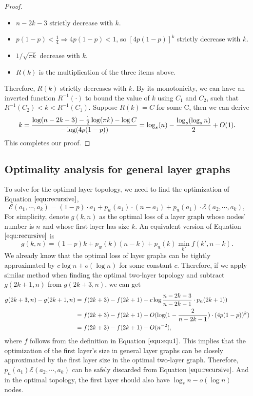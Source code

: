 \documentclass[a4paper,UKenglish]{lipics}
\theoremstyle{definition}
\begin{document}
\begin{proof}
\begin{itemize}
\item $ n-2k-3 $ strictly decrease with $ k $.
\item $ p(1-p) < \frac{1}{4} \Rightarrow 4p(1-p)<1 $, so $ \left[4p(1-p)\right]^k $ strictly decrease with $ k $.
\item $ {1}\Big/{\sqrt{\pi k}} $ decrease with $ k $.
\item $R(k)$ is the multiplication of the three items above.
\end{itemize}
Therefore, $R(k)$ strictly decreases with $k$. 
By its monotonicity, we can have an inverted function $ R^{-1}(\cdot)$ to bound the value of $k$ using $C_1$ and $C_2$, 
	such that $R^{-1}(C_2) < k < R^{-1}(C_1)$. 
Suppose $R(k)=C$ for some C, then we can derive
\begin{equation*}
	k 
= 
	\frac{\log(n-2k-3)-\frac{1}{2}\log(\pi k) - \log C}{-\log(4p(1-p))}
=
	\log_{s}(n)-{\log_s( \log_s n)\over 2} + O(1).
\end{equation*}
This completes our proof.
\end{proof}



\subsection {Optimality analysis for general layer graphs}
\label {subsec:optimality all layers}

To solve for the optimal layer topology, we need to find the optimization of Equation $\ref{equ:recursive}$,
\begin{equation*}
\mathcal{E}(a_1, \dotsb, a_k)
=
(1-p)\cdot a_1 + p_w(a_1)\cdot (n - a_1) + p_n(a_1)\cdot \mathcal{E}(a_2, \dotsb, a_k),
\end{equation*}
For simplicity, denote $g(k, n)$ as the optimal loss of a layer graph whose nodes' number is $n$ and whose first layer has size $k$.
An equivalent version of Equation $\ref{equ:recursive}$ is
\begin{equation*}
g(k, n) = (1-p)k + p_w(k)(n-k) + p_n(k)\min_{k'}f(k',n-k).
\end{equation*}
We already know that the optimal loss of layer graphs can be tightly approximated by $c\log n + o(\log n)$ for some constant $c$.
Therefore, if we apply similar method when finding the optimal two-layer topology and subtract $g(2k+1, n)$ from $g(2k+3, n)$,
	we can get
\begin{align*}
	g(2k+3,n) - g(2k+1,n)
& =
	f(2k+3) - f(2k+1) + c\log {n - 2k - 3 \over n - 2k - 1}\cdot p_n(2k+1) ) \\
& =
	f(2k+3) - f(2k+1) + O( \log (1 - {2 \over n - 2k - 1})\cdot (4p(1-p))^{k}) \\
& =
	f(2k+3) - f(2k+1) + O(n^{-2}),
\end{align*}
where $f$ follows from the definition in Equation $\ref{equ:equ1}$.
This implies that the optimization of the first layer's size in general layer graphs can be closely approximated by
	the first layer size in the optimal two-layer graph.
Therefore, $p_n(a_1)\mathcal{E}(a_2, \dotsb, a_k)$ can be safely discarded from Equation $\ref{equ:recursive}$.
And in the optimal topology, the first layer should also have $\log_{s} n - o(\log n)$ nodes.
\end{document}
